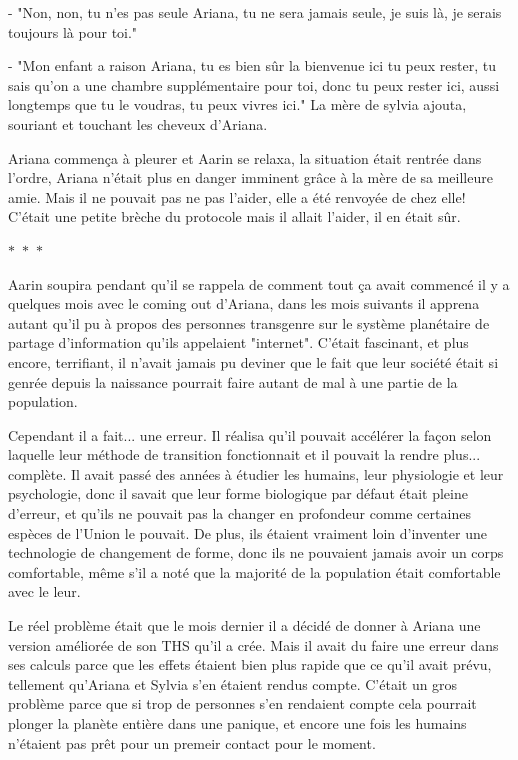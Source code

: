 \documentclass[12pt,hidelinks,a4paper]{book}
\newcommand{\sep}{\begin{center}
    $\ast$~$\ast$~$\ast$
  \end{center}}
\begin{document}
- "Non, non, tu n'es pas seule Ariana, tu ne sera jamais seule, je suis là, je serais toujours là 
pour toi."\par \bigskip

- "Mon enfant a raison Ariana, tu es bien sûr la bienvenue ici tu peux rester, tu sais qu'on a une chambre 
supplémentaire pour toi, donc tu peux rester ici, aussi longtemps que tu le voudras, tu peux vivres ici." La mère de 
sylvia ajouta, souriant et touchant les cheveux d'Ariana.\par 
\bigskip

Ariana commença à pleurer et Aarin se relaxa, la situation était rentrée dans l'ordre, Ariana n'était plus en danger 
imminent grâce à la mère de sa meilleure amie. Mais il ne pouvait pas ne pas l'aider, elle a été renvoyée de chez elle!
C'était une petite brèche du protocole mais il allait l'aider, il en était sûr.

\sep

Aarin soupira pendant qu'il se rappela de comment tout ça avait commencé il y a quelques mois avec le coming out
d'Ariana, dans les mois suivants il apprena autant qu'il pu à propos des personnes transgenre sur le système planétaire 
de partage d'information qu'ils appelaient "internet". C'était fascinant, et plus encore, terrifiant, il n'avait jamais 
pu deviner que le fait que leur société était si genrée depuis la naissance pourrait faire autant de mal à une partie 
de la population.\par 
\bigskip 

Cependant il a fait... une erreur. Il réalisa qu'il pouvait accélérer la façon selon laquelle leur méthode de transition 
fonctionnait et il pouvait la rendre plus... complète. Il avait passé des années à étudier les humains, leur physiologie 
et leur psychologie, donc il savait que leur forme biologique par défaut était pleine d'erreur, et qu'ils ne pouvait pas 
la changer en profondeur comme certaines espèces de l'Union le pouvait. De plus, ils étaient vraiment loin d'inventer 
une technologie de changement de forme, donc ils ne pouvaient jamais avoir un corps comfortable, même s'il a noté 
que la majorité de la population était comfortable avec le leur.\par 
\bigskip

Le réel problème était que le mois dernier il a décidé de donner à Ariana une version améliorée de son THS qu'il a crée.
Mais il avait du faire une erreur dans ses calculs parce que les effets étaient bien plus rapide que ce qu'il avait prévu,
tellement qu'Ariana et Sylvia s'en étaient rendus compte. C'était un gros problème parce que si trop de personnes s'en rendaient 
compte cela pourrait plonger la planète entière dans une panique, et encore une fois les humains n'étaient pas prêt pour 
un premeir contact pour le moment. \par 
\bigskip
\end{document}
